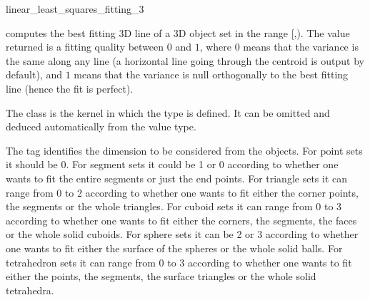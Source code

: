 \begin{ccRefFunction}{linear_least_squares_fitting_3}

{ computes the best fitting 3D line of a 3D object set in the range
[,). The value returned is a fitting quality
between $0$ and $1$, where $0$ means that the variance is the same
along any line (a horizontal line going through the centroid is output
by default), and $1$ means that the variance is null orthogonally
to the best fitting line (hence the fit is perfect). }

The class  is the kernel in which the type  is defined. It can be omitted and deduced automatically from the value type.

The tag  identifies the dimension to be considered from the objects. For point sets it should be 0. For segment sets it could be 1 or 0 according to whether one wants to fit the entire segments or just the end points. For triangle sets it can range from 0 to 2 according to whether one wants to fit either the corner points, the segments or the whole triangles. For cuboid sets it can range from 0 to 3 according to whether one wants to fit either the corners, the segments, the faces or the whole solid cuboids. For sphere sets it can be 2 or 3 according to whether one wants to fit either the surface of the spheres or the whole solid balls. For tetrahedron sets it can range from 0 to 3 according to whether one wants to fit either the points, the segments, the surface triangles or the whole solid tetrahedra.



\end{ccRefFunction}
